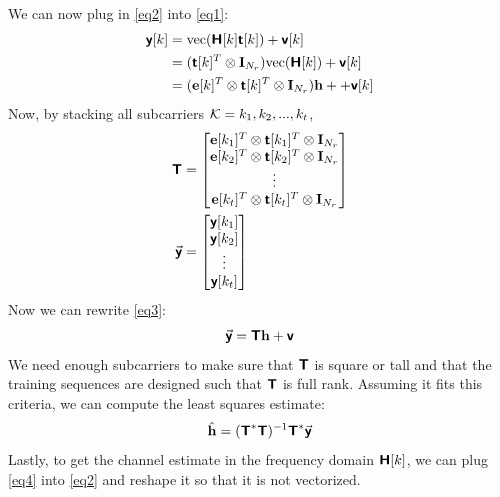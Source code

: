 \documentclass{book}
\begin{document}
    We can now plug in \ref{eq2} into \ref{eq1}:
    \begin{align}
        {\bm{\mathsf{y}}}[k] &= \mathrm{vec}(\bm{\mathsf{H}}[k]{\bm{\mathsf{t}}}[k]) + {\bm{\mathsf{v}}}[k] \\
        &= ({\bm{\mathsf{t}}}[k]^T \otimes {\mathbf{I}}_{N_r})\mathrm{vec}(\bm{\mathsf{H}}[k]) + {\bm{\mathsf{v}}}[k] \\
        &=({\mathbf{e}}[k]^T \otimes {\bm{\mathsf{t}}}[k]^T \otimes {\mathbf{I}}_{N_r}){\mathbf{h}} + + {\bm{\mathsf{v}}}[k] \label{eq3}
    \end{align}
    Now, by stacking all subcarriers $\mathcal{K} = {k_1, k_2, ..., k_t}$,
    \begin{align}
        \bm{\mathsf{T}} &= \begin{bmatrix}
                        {\mathbf{e}}[k_1]^T \otimes {\bm{\mathsf{t}}}[k_1]^T \otimes {\mathbf{I}}_{N_r} \\
                        {\mathbf{e}}[k_2]^T \otimes {\bm{\mathsf{t}}}[k_2]^T \otimes {\mathbf{I}}_{N_r} \\
                        \vdots \\ 
                        {\mathbf{e}}[k_t]^T \otimes {\bm{\mathsf{t}}}[k_t]^T \otimes {\mathbf{I}}_{N_r}
                    \end{bmatrix} \\ 
        \vec{{\bm{\mathsf{y}}}} &= \begin{bmatrix}
                {\bm{\mathsf{y}}}[k_1] \\ {\bm{\mathsf{y}}}[k_2] \\ \vdots \\ {\bm{\mathsf{y}}}[k_t]
        \end{bmatrix}
    \end{align}
    Now we can rewrite \ref{eq3}:
    \begin{equation}
        \vec{{\bm{\mathsf{y}}}} = \bm{\mathsf{T}} {\mathbf{h}} + {\bm{\mathsf{v}}}
    \end{equation}
    We need enough subcarriers to make sure that $\bm{\mathsf{T}}$ is square or tall and that the training sequences are designed such that $\bm{\mathsf{T}}$ is full rank. Assuming it fits this criteria, we can compute the least squares estimate:
    \begin{equation}\label{eq4}
        \hat{{\mathbf{h}}} = (\bm{\mathsf{T}}^*\bm{\mathsf{T}})^{-1}\bm{\mathsf{T}}^*\vec{{\bm{\mathsf{y}}}}
    \end{equation}
    Lastly, to get the channel estimate in the frequency domain $\bm{\mathsf{H}}[k]$, we can plug \ref{eq4} into \ref{eq2} and reshape it so that it is not vectorized.
\end{document}
